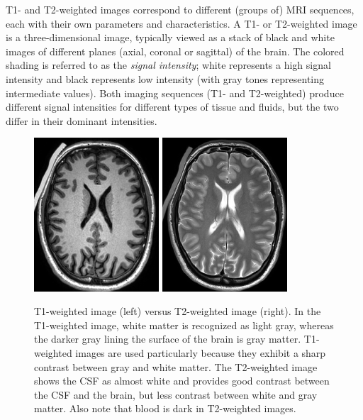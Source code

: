 T1- and T2-weighted images correspond to different (groups of) MRI
sequences, each with their own parameters and characteristics. A T1-
or T2-weighted image is a three-dimensional image, typically viewed as
a stack of black and white images of different planes (axial, coronal
or sagittal) of the brain. The colored shading is referred to as the
\emph{signal intensity}; white represents a high signal intensity and
black represents low intensity (with gray tones representing
intermediate values). Both imaging sequences (T1- and T2-weighted)
produce different signal intensities for different types of tissue and
fluids, but the two differ in their dominant intensities.

\begin{figure}
  \centering
  \includegraphics[width=0.415\textwidth]{./graphics/chp2/T1-image.png}
  \includegraphics[width=0.415\textwidth]{./graphics/chp2/T2-image.png}
  \caption{T1-weighted image (left) versus T2-weighted image (right).
    In the T1-weighted image, white matter is recognized as light
    gray, whereas the darker gray lining the surface of the brain is
    gray matter. T1-weighted images are used particularly because they
    exhibit a sharp contrast between gray and white matter. The
    T2-weighted image shows the CSF as almost white and provides good
    contrast between the CSF and the brain, but less contrast between
    white and gray matter. Also note that blood is dark in
    T2-weighted images.}
  \label{fig:chp2:t1vt2}
\end{figure}
